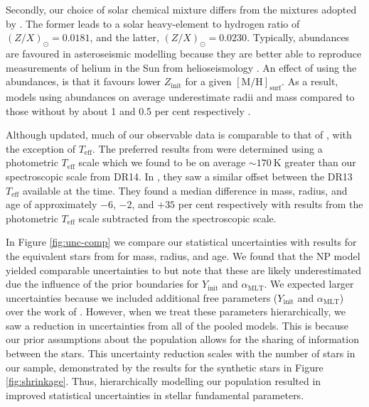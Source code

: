 \documentclass[a4paper,fleqn,usenatbib]{mnras}
\newcommand{\metallicity}{\ensuremath{[\mathrm{M}/\mathrm{H}]}}
\newcommand{\teff}{\ensuremath{T_\mathrm{eff}}}
\newcommand{\mlt}{\ensuremath{{\alpha_\mathrm{MLT}}}}
\begin{document}
Secondly, our choice of \citet{Asplund.Grevesse.ea2009} solar chemical mixture differs from the \citet{Grevesse.Sauval1998} mixtures adopted by . The former leads to a solar heavy-element to hydrogen ratio of $(Z/X)_\odot = 0.0181$, and the latter, $(Z/X)_\odot = 0.0230$. Typically, \citet{Grevesse.Sauval1998} abundances are favoured in asteroseismic modelling because they are better able to reproduce measurements of helium in the Sun from helioseismology \citep{Serenelli.Basu.ea2009}. An effect of using the \citet{Asplund.Grevesse.ea2009} abundances, is that it favours lower $Z_\mathrm{init}$ for a given $\metallicity_\mathrm{surf}$. As a result, models using \citet{Grevesse.Sauval1998} abundances on average underestimate radii and mass compared to those without by about 1 and 0.5 per cent respectively \citep{Nsamba.Campante.ea2018}.

Although updated, much of our observable data is comparable to that of , with the exception of $\teff$. The preferred results from  were determined using a photometric $\teff$ scale which we found to be on average $\sim \SI{170}{\kelvin}$ greater than our spectroscopic scale from DR14. In , they saw a similar offset between the DR13 $\teff$ available at the time. They found a median difference in mass, radius, and age of approximately $-6$, $-2$, and $+35$ per cent respectively with results from the photometric $\teff$ scale subtracted from the spectroscopic scale.

In Figure \ref{fig:unc-comp} we compare our statistical uncertainties with results for the equivalent stars from  for mass, radius, and age. We found that the NP model yielded comparable uncertainties to  but note that these are likely underestimated due the influence of the prior boundaries for $Y_\mathrm{init}$ and $\mlt$. We expected larger uncertainties because we included additional free parameters ($Y_\mathrm{init}$ and $\mlt$) over the work of . However, when we treat these parameters hierarchically, we saw a reduction in uncertainties from all of the pooled models. This is because our prior assumptions about the population allows for the sharing of information between the stars. This uncertainty reduction scales with the number of stars in our sample, demonstrated by the results for the synthetic stars in Figure \ref{fig:shrinkage}. Thus, hierarchically modelling our population resulted in improved statistical uncertainties in stellar fundamental parameters.
\end{document}
